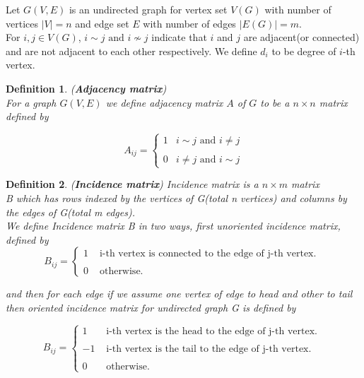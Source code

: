 \documentclass[oneside]{book}
\newtheorem{mydef}{Definition}[section]
\begin{document}
	Let $G(V, E)$ is an undirected graph for vertex set $V(G)$ with number of vertices $|V|=n$  and edge set $E$ with number of edges $|E(G)| = m $.\\
For \(i, j \in V(G) \), $i\sim j \text{ and } i\nsim j   $ indicate that \(i\) and \(j\) are adjacent(or connected) and are not adjacent to each other respectively.
We define $d_{i}$ to be degree of $i$-th vertex.
\begin{mydef}(\textbf{Adjacency matrix})\\
	For a graph  $G(V, E)$ we define adjacency matrix $A$ of $G$ to be a $ n \times n $ matrix     defined by  
\end{mydef}	
	
\begin{equation*} A_{ij}=\left\{\begin{array}{ll}
1 &  i\sim j \text{ and } i \neq j  \\\\
0 &        i\neq j \text{ and } i\sim j 
\end{array}\right.\end{equation*}	
	
	
	
	
	
	
\begin{mydef}(\textbf{Incidence matrix})
	 Incidence matrix is  a $ n \times m $ matrix \\
	  B which has rows indexed by the vertices of G(total n vertices) and columns by the edges of G(total m edges).  \\  
	 We define Incidence matrix B in two ways, first  unoriented incidence matrix, defined by 
\begin{equation*} B_{ij}=\left\{\begin{array}{ll}
1 &  \text{ i-th vertex is connected to the edge of j-th vertex. } \\\\
0 &       \text{ otherwise. }
\end{array}\right.\end{equation*}	
	 
	 and then for each edge if we assume one vertex of edge to head and other to tail then oriented incidence matrix for undirected graph G is defined by 
	 
	 
	 \begin{equation*} B_{ij}=\left\{\begin{array}{ll}
	 1 &  \text{ i-th vertex is the head to the edge of j-th vertex. } \\\\
	 -1&  \text{ i-th vertex is the tail to the edge of j-th vertex. } \\\\
	 0 &       \text{ otherwise. }
	 \end{array}\right.\end{equation*}	 
\end{mydef}
\end{document}
